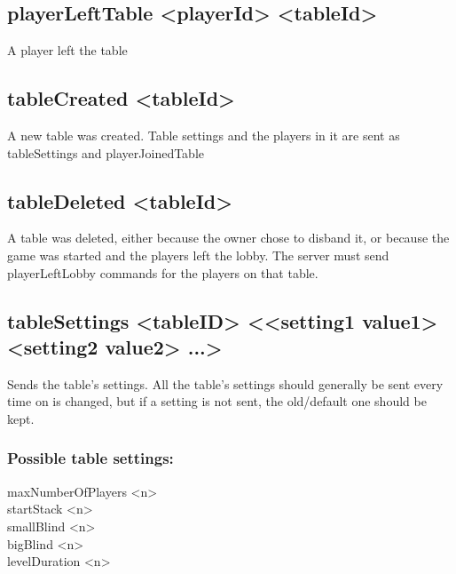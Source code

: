 \documentclass{article}
\begin{document}
\subsection*{playerLeftTable <playerId> <tableId>}
A player left the table

\subsection*{tableCreated <tableId>}
A new table was created. Table settings and the players in it are sent as tableSettings and playerJoinedTable

\subsection*{tableDeleted <tableId>}
A table was deleted, either because the owner chose to disband it, or because the game was started and the players left the lobby. The server must send playerLeftLobby commands for the players on that table.

\subsection*{tableSettings <tableID> <{}<setting1 value1> <setting2 value2> ...>}
Sends the table's settings. All the table's settings should generally be sent every time on is changed, but if a setting is not sent, the old/default one should be kept.

\subsubsection*{Possible table settings:}
\begin{description}
\item[maxNumberOfPlayers <n>]
\item[startStack <n>]
\item[smallBlind <n>]
\item[bigBlind <n>]
\item[levelDuration <n>]
\end{description}
\end{document}
